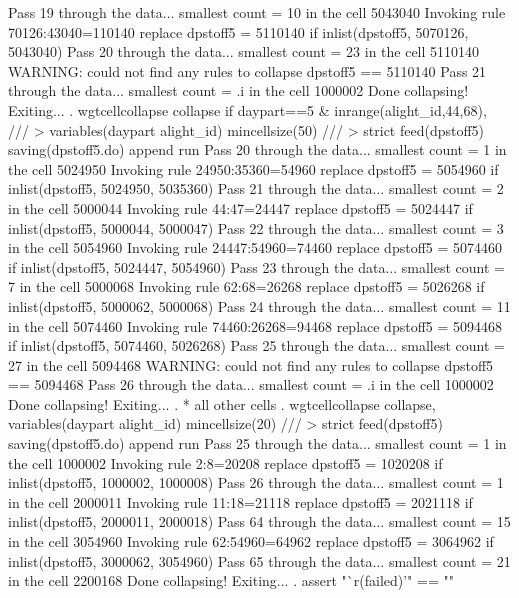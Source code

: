 Pass 19 through the data...
  smallest count = 10 in the cell      5043040
  Invoking rule 70126:43040=110140
  replace dpstoff5 = 5110140 if inlist(dpstoff5, 5070126, 5043040)
Pass 20 through the data...
  smallest count = 23 in the cell      5110140
  WARNING: could not find any rules to collapse dpstoff5 == 5110140
Pass 21 through the data...
  smallest count = .i in the cell      1000002
  Done collapsing! Exiting...
{\smallskip}
\cnp
. wgtcellcollapse collapse if daypart==5 \& inrange(alight_id,44,68), ///
>         variables(daypart alight_id) mincellsize(50) ///
>         strict feed(dpstoff5) saving(dpstoff5.do) append run
Pass 20 through the data...
  smallest count = 1 in the cell      5024950
  Invoking rule 24950:35360=54960
  replace dpstoff5 = 5054960 if inlist(dpstoff5, 5024950, 5035360)
Pass 21 through the data...
  smallest count = 2 in the cell      5000044
  Invoking rule 44:47=24447
  replace dpstoff5 = 5024447 if inlist(dpstoff5, 5000044, 5000047)
Pass 22 through the data...
  smallest count = 3 in the cell      5054960
  Invoking rule 24447:54960=74460
  replace dpstoff5 = 5074460 if inlist(dpstoff5, 5024447, 5054960)
Pass 23 through the data...
  smallest count = 7 in the cell      5000068
  Invoking rule 62:68=26268
  replace dpstoff5 = 5026268 if inlist(dpstoff5, 5000062, 5000068)
Pass 24 through the data...
  smallest count = 11 in the cell      5074460
  Invoking rule 74460:26268=94468
  replace dpstoff5 = 5094468 if inlist(dpstoff5, 5074460, 5026268)
Pass 25 through the data...
  smallest count = 27 in the cell      5094468
  WARNING: could not find any rules to collapse dpstoff5 == 5094468
Pass 26 through the data...
  smallest count = .i in the cell      1000002
  Done collapsing! Exiting...
{\smallskip}
. * all other cells
. wgtcellcollapse collapse, variables(daypart alight_id) mincellsize(20) ///
>         strict feed(dpstoff5) saving(dpstoff5.do) append run
Pass 25 through the data...
  smallest count = 1 in the cell      1000002
  Invoking rule 2:8=20208
  replace dpstoff5 = 1020208 if inlist(dpstoff5, 1000002, 1000008)
Pass 26 through the data...
  smallest count = 1 in the cell      2000011
  Invoking rule 11:18=21118
  replace dpstoff5 = 2021118 if inlist(dpstoff5, 2000011, 2000018)
\smallskip
\oom
\smallskip
Pass 64 through the data...
  smallest count = 15 in the cell      3054960
  Invoking rule 62:54960=64962
  replace dpstoff5 = 3064962 if inlist(dpstoff5, 3000062, 3054960)
Pass 65 through the data...
  smallest count = 21 in the cell      2200168
  Done collapsing! Exiting...
{\smallskip}
. assert "`r(failed)'" == ""
{\smallskip}
